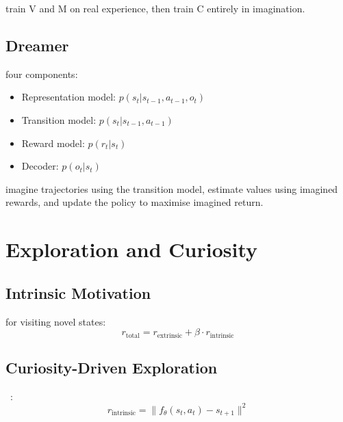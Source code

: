  train V and M on real experience, then train C entirely in imagination.

\subsection{Dreamer}


 four components:
\begin{itemize}
    \item Representation model: $p(s_t | s_{t-1}, a_{t-1}, o_t)$
    \item Transition model: $p(s_t | s_{t-1}, a_{t-1})$
    \item Reward model: $p(r_t | s_t)$
    \item Decoder: $p(o_t | s_t)$
\end{itemize}

 imagine trajectories using the transition model, estimate values using imagined rewards, and update the policy to maximise imagined return.


\section{Exploration and Curiosity}


\subsection{Intrinsic Motivation}

 for visiting novel states:
\begin{equation}
    r_{\text{total}} = r_{\text{extrinsic}} + \beta \cdot r_{\text{intrinsic}}
\end{equation}

\subsection{Curiosity-Driven Exploration}

~\cite{Pathak2017Curiosity}:
\begin{equation}
    r_{\text{intrinsic}} = \|f_\theta(s_t, a_t) - s_{t+1}\|^2
\end{equation}

